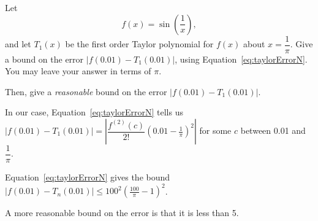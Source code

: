 \begin{question}
Let \[f(x)= \sin\left(\dfrac{1}{x}\right),\] and let $T_1(x)$ be the first order Taylor polynomial for $f(x)$ about $x=\dfrac{1}{\pi}$. Give a bound on the error $|f(0.01)-T_1(0.01)|$, using Equation~\ref*{eq:taylorErrorN}. You may leave your answer in terms of $\pi$.

Then, give a \emph{reasonable} bound on the error $|f(0.01)-T_1(0.01)|$.
\end{question}
\begin{hint}
In our case, Equation~\ref*{eq:taylorErrorN} tells us\\
$\left|f\left(0.01\right)-T_1\left(0.01\right)\right| = \left|\dfrac{f^{(2)}(c)}{2!}\left(0.01-\frac{1}{\pi}\right)^2\right|$ for some $c$ between 0.01 and $\dfrac{1}{\pi}$.
\end{hint}
\begin{answer}
Equation~\ref*{eq:taylorErrorN}  gives the bound
$|f(0.01)-T_n(0.01)| \leq 100^2\left(\frac{100}{\pi}-1\right)^2$.

A more reasonable bound on the error is that it is less than 5.
\end{answer}
